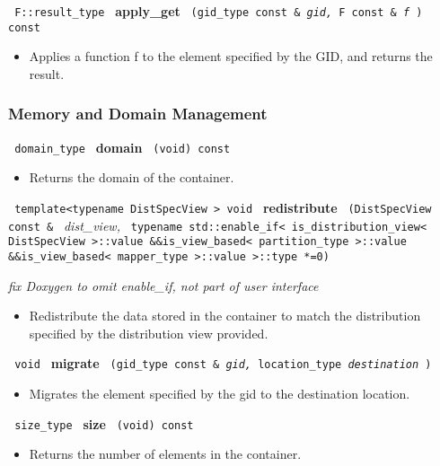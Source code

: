 \noindent
\texttt{%
F::result\_type
}
\textbf{apply\_get}%
\texttt{%
(gid\_type const \&
\textit{gid,}%
F const \&
\textit{f}%
) const
}

\begin{itemize}
\item
Applies a function f to the element specified by the GID, and returns the result.
\end{itemize}
 

\subsubsection{Memory and Domain Management}

\noindent
\texttt{%
domain\_type 	
}
\textbf{domain}%
\texttt{%
(void) const
}

\begin{itemize}
\item
Returns the domain of the container.
\end{itemize}
 
\noindent
\texttt{%
template<typename DistSpecView >
void
}
\textbf{redistribute}%
\texttt{%
(DistSpecView const \&
}
\textit{dist\_view,}
\texttt{
typename std::enable\_if< is\_distribution\_view< DistSpecView >::value \&\&is\_view\_based< partition\_type >::value \&\&is\_view\_based< mapper\_type >::value >::type *=0)
}

\vspace{0.4cm} \emph{fix Doxygen to omit enable\_if, not part of user interface}

\begin{itemize}
\item
Redistribute the data stored in the container to match the distribution specified by the distribution view provided. 
\end{itemize}
 
\noindent
\texttt{%
void
}
\textbf{migrate}%
\texttt{%
(gid\_type const \&
\textit{gid,}
location\_type 
\textit{destination}
)
}

\begin{itemize}
\item
Migrates the element specified by the gid to the destination location. 
\end{itemize}
 
\noindent
\texttt{%
size\_type
}
\textbf{size}%
\texttt{%
(void) const
}

\begin{itemize}
\item
Returns the number of elements in the container. 
\end{itemize}
 
